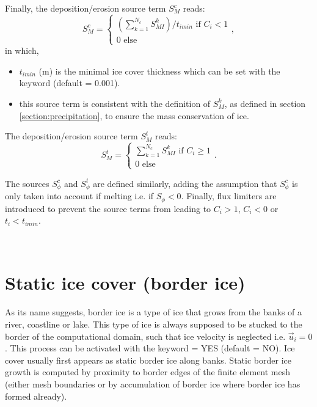 Finally, the deposition/erosion source term $S_{M}^c$ reads:
\begin{equation}
  S_{M}^c=
\left\{
    \begin{array}{l}  
  (\sum^{N_c}_{k=1} S_{MI}^k)/ t_{imin} \text{ if } C_i < 1 \\
  0 \text{ else}
    \end{array}
    \right. ,
\end{equation}
in which,
\begin{itemize}
  \item $t_{imin}$ (m) is the minimal ice cover thickness which can be set with the keyword  (default = 0.001).
  \item this source term is consistent with the definition of $S_M^k$, as defined in section \ref{section:precipitation}, to ensure the mass conservation of ice.
\end{itemize}

The deposition/erosion source term $S_{M}^t$ reads:
\begin{equation}
  S_{M}^t=\left\{
    \begin{array}{l}
      \sum^{N_c}_{k=1} S_{MI}^k  \text{ if } C_i \geq 1 \\
      0 \text{ else}
    \end{array}
    \right..
\end{equation}

The sources $S_{\phi}^c$ and $S_{\phi}^t$ are defined similarly, adding the assumption
that $S_{\phi}^c$ is only taken into account if melting i.e. if $S_{\phi}<0$.
Finally, flux limiters are introduced to prevent the source terms from leading to $C_i > 1$, $C_i < 0$ or $t_i < t_{imin}$. 


~\newline
\section{Static ice cover (border ice) } 
\label{section:static_ice_cover}


As its name suggests, border ice is a type of ice that grows from the banks of a river, coastline or lake.
This type of ice is always supposed to be stucked to the border of the computational domain, such that
ice velocity is neglected i.e. $\vec{u}_i = 0$.
This process can be activated with the keyword  = YES (default = NO).
Ice cover usually first appears as static border ice along banks. Static border ice growth is computed by proximity to border edges of the finite element mesh (either mesh boundaries or by accumulation of border ice where border ice has formed already).\newline

